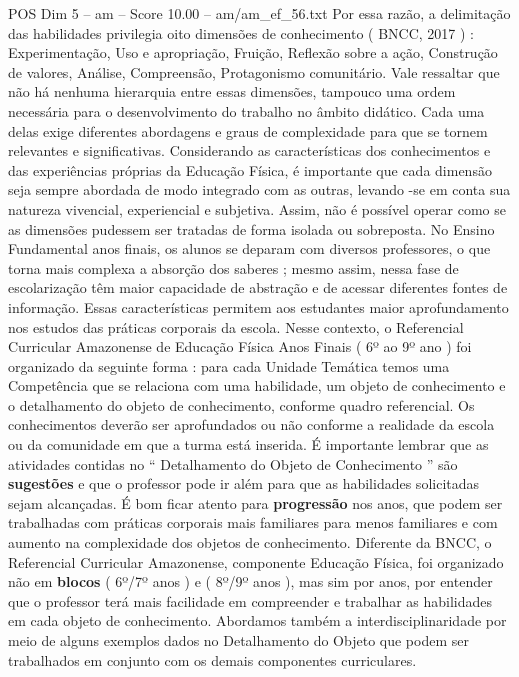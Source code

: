 \begin{textsample}{POS Dim 5 – am – Score 10.00 – am/am\_ef\_56.txt}
Por essa razão, a delimitação das habilidades privilegia oito dimensões de conhecimento ( BNCC, 2017 ) : Experimentação, Uso e apropriação, Fruição, Reflexão sobre a ação, Construção de valores, Análise, Compreensão, Protagonismo comunitário.
Vale ressaltar que não há nenhuma hierarquia entre essas dimensões, tampouco uma ordem necessária para o desenvolvimento do trabalho no âmbito didático.
Cada uma delas exige diferentes abordagens e graus de complexidade para que se tornem relevantes e significativas.
Considerando as características dos conhecimentos e das experiências próprias da Educação Física, é importante que cada dimensão seja sempre abordada de modo integrado com as outras, levando -se em conta sua natureza vivencial, experiencial e subjetiva.
Assim, não é possível operar como se as dimensões pudessem ser tratadas de forma isolada ou sobreposta.
No Ensino Fundamental anos finais, os alunos se deparam com diversos professores, o que torna mais complexa a absorção dos saberes ; mesmo assim, nessa fase de escolarização têm maior capacidade de abstração e de acessar diferentes fontes de informação.
Essas características permitem aos estudantes maior aprofundamento nos estudos das práticas corporais da escola.
Nesse contexto, o Referencial Curricular Amazonense de Educação Física Anos Finais ( 6º ao 9º ano ) foi organizado da seguinte forma : para cada Unidade Temática temos uma Competência que se relaciona com uma habilidade, um objeto de conhecimento e o detalhamento do objeto de conhecimento, conforme quadro referencial.
Os conhecimentos deverão ser aprofundados ou não conforme a realidade da escola ou da comunidade em que a turma está inserida.
É importante lembrar que as atividades contidas no “ Detalhamento do Objeto de Conhecimento ” são \textbf{sugestões} e que o professor pode ir além para que as habilidades solicitadas sejam alcançadas.
É bom ficar atento para \textbf{progressão} nos anos, que podem ser trabalhadas com práticas corporais mais familiares para menos familiares e com aumento na complexidade dos objetos de conhecimento.
Diferente da BNCC, o Referencial Curricular Amazonense, componente Educação Física, foi organizado não em \textbf{blocos} ( 6º/7º anos ) e ( 8º/9º anos ), mas sim por anos, por entender que o professor terá mais facilidade em compreender e trabalhar as habilidades em cada objeto de conhecimento.
Abordamos também a interdisciplinaridade por meio de alguns exemplos dados no Detalhamento do Objeto que podem ser trabalhados em conjunto com os demais componentes curriculares.

\end{textsample}
